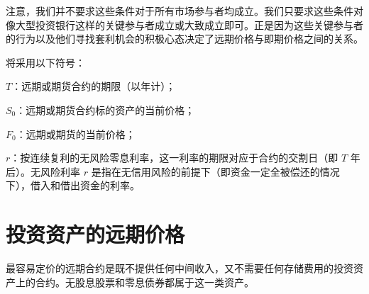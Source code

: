 注意，我们并不要求这些条件对于所有市场参与者均成立。我们只要求这些条件对像大型投资银行这样的关键参与者成立或大致成立即可。正是因为这些关键参与者的行为以及他们寻找套利机会的积极心态决定了远期价格与即期价格之间的关系。

将采用以下符号：

$T$：远期或期货合约的期限（以年计）；

$S_0$：远期或期货合约标的资产的当前价格；

$F_0$：远期或期货的当前价格；

$r$：按连续复利的无风险零息利率，这一利率的期限对应于合约的交割日（即 $T$ 年后）。无风险利率 $r$ 是指在无信用风险的前提下（即资金一定全被偿还的情况下），借入和借出资金的利率。
\section{投资资产的远期价格}
最容易定价的远期合约是既不提供任何中间收入，又不需要任何存储费用的投资资产上的合约。无股息股票和零息债券都属于这一类资产。
